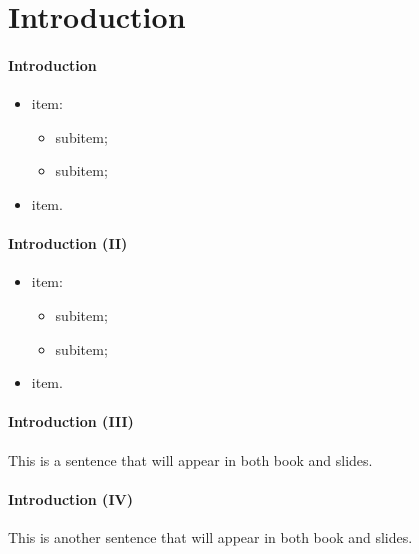 \setcounter{chapter}{0}
\chapter{Introduction}

\begin{frame}
\frametitle{Introduction}
\begin{itemize}
\item {} item:
\begin{itemize}
\item {} subitem;
\item {} subitem;
\end{itemize}
\item {}  item.
\end{itemize}
\end{frame}

\begin{frame}
\frametitle{Introduction (II)}
\begin{itemize}
\item {} item:
\begin{itemize}
\item {} subitem;
\item {} subitem;
\end{itemize}
\item {}  item.
\end{itemize}
\end{frame}

\begin{frame}
\frametitle{Introduction (III)}
This is a sentence that will appear in both book and slides.
\end{frame}

\begin{frame}
\frametitle{Introduction (IV)}
This is another sentence that will appear in both book and slides.
\end{frame}


